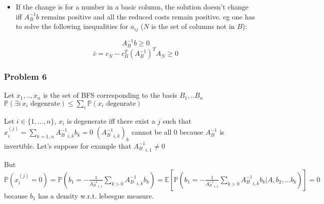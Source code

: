 \documentclass[12pt]{article}
\newcommand{\Q}[1]{\subsubsection*{Problem #1}}
\begin{document}
\begin{itemize}
\begin{itemize}
\item If the change is for a number in a basic column, the solution doesn't change iff $A_B^{-1}b$ remains positive and all the reduced costs remain positive. eg one has to solve the following inequalities for $a_{ij}$ ($N$ is the set of columns not in $B$):

$$ A_B^{-1} b \geq 0$$
$$ \bar c = c_N - c_B^T(A_B^{-1})^TA_N \geq 0$$


\end{itemize}
\end{itemize}
\Q{6}

Let $x_1,..,x_n$ is the set of BFS corresponding to the basis $B_1,..B_n$
$\mathbb{P}( \exists i \, x_i \text{ degenrate}) \leq \sum_i \mathbb{P}( x_i \text{ degenrate})$

Let $i \in \{1, ..., n\}$, $x_i$ is degenerate iff there exist a $j$ such that $x_i^{(j)} = \sum_{k=1..n} {A_B^{-1}}_{i,k} b_k = 0$
$({A_B^{-1}}_{i,k})_k$ cannot be all 0 because $A_B^{-1}$ is invertible. Let's suppose for example that ${A_B^{-1}}_{i,1} \neq 0$

But $\mathbb{P}(x_i^{(j)} = 0) = \mathbb{P}( b_1 = -\frac{1}{{A_B^{-1}}_{i,1}} \sum_{k > 0}{A_B^{-1}}_{i,k} b_k) = \mathbb{E} \left[ \mathbb{P}( b_1 = -\frac{1}{{A_B^{-1}}_{i,1}} \sum_{k > 0}{A_B^{-1}}_{i,k} b_k | A, b_2, ... b_k) \right] = 0$ because $b_1$ has a density w.r.t. lebesgue measure.
\end{document}
